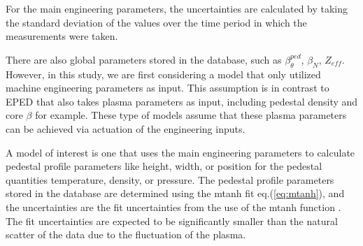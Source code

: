 \documentclass[a4paper, twoside, final, 12pt]{article}
\begin{document}
For the main engineering parameters, the uncertainties are calculated by taking the standard deviation of the values over the time period in which the measurements were taken. 

There are also global parameters stored in the database, such as $\beta_\theta^{ped}$, $\beta_N$, $Z_{eff}$. However, in this study, we are first considering a model that only utilized machine engineering parameters as input. This assumption is in contrast to EPED that also takes plasma parameters as input, including pedestal density and core  $\beta$ for example. These type of models assume that these plasma parameters can be achieved via actuation of the engineering inputs. 

A model of interest is one that uses the main engineering parameters to calculate pedestal profile parameters like height, width, or position for the pedestal quantities temperature, density, or pressure.
The pedestal profile parameters stored in the database are determined using the mtanh fit eq.\;(\ref{eq:mtanh}), and the uncertainties are the fit uncertainties from the use of the mtanh function \cite{Frassinetti_2020}.
The fit uncertainties are expected to be significantly smaller than the natural scatter of the data due to the fluctuation of the plasma.
\end{document}
